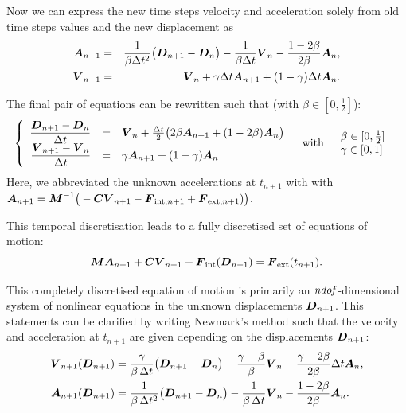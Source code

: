 Now we can express the new time steps velocity and acceleration solely from old time steps values and the new displacement as
\begin{eqnarray*}
  \boldsymbol{A}_{n+1}
  &=& \frac{1}{\beta\Delta t^2} \big( \boldsymbol{D}_{n+1} - \boldsymbol{D}_n \big)
  - \frac{1}{\beta \Delta t} \boldsymbol{V}_n
  - \frac{1-2\beta}{2\beta} \boldsymbol{A}_n\text{,}\\
    \boldsymbol{V}_{n+1}
  &=& \boldsymbol{V}_{n} + \gamma\Delta t \boldsymbol{A}_{n+1} + (1-\gamma)\Delta t\boldsymbol{A}_n\text{.}
\end{eqnarray*}

The final pair of equations can be rewritten such that (with $\beta\in[0,\frac{1}{2}]$):
\begin{equation}\label{strdyn:eq:newmark}
\begin{aligned}
& \left\{\begin{array}{rcl}
  \dfrac{\boldsymbol{D}_{n+1} - \boldsymbol{D}_n}{\Delta t}
  & =
  & \boldsymbol{V}_n + \frac{\Delta t}{2} \big(
    2\beta \boldsymbol{A}_{n+1} + (1-2\beta) \boldsymbol{A}_n
    \big)
\\
  \dfrac{\boldsymbol{V}_{n+1} - \boldsymbol{V}_n}{\Delta t}
  & =
  & \gamma \boldsymbol{A}_{n+1} + (1-\gamma)\boldsymbol{A}_n
\end{array}\right.
&& \text{with}
&&\begin{array}{l}
  \beta\in[0,\frac{1}{2}]
\\
  \gamma\in[0,1]
\end{array}
\end{aligned}
\end{equation}
Here, we abbreviated the unknown accelerations at $t_{n+1}$ with with
$\boldsymbol{A}_{n+1} = \boldsymbol{M}^{-1} \big( -\boldsymbol{C} \boldsymbol{V}_{n+1} -
\boldsymbol{F}_{\text{int};n+1} + \boldsymbol{F}_{\text{ext};n+1}) \big)$. 

This temporal discretisation leads to a
fully discretised set of equations of motion:
\begin{equation}
  \boldsymbol{M} \boldsymbol{A}_{n+1}
  + \boldsymbol{C} \boldsymbol{V}_{n+1}
  + \boldsymbol{F}_{\text{int}}(\boldsymbol{D}_{n+1})
  = \boldsymbol{F}_{\text{ext}}(t_{n+1})
  \text{.}
\end{equation}

This completely discretised equation of motion is primarily an
$\mathit{ndof}$-dimensional system of nonlinear equations in the unknown displacements
$\boldsymbol{D}_{n+1}$. This statements can be clarified by writing Newmark's method
such that the velocity and acceleration at $t_{n+1}$ are given depending on the
displacements $\boldsymbol{D}_{n+1}$:
\begin{align}\label{strdyn:eq:newmark-velnew}
   \boldsymbol{V}_{n+1}(\boldsymbol{D}_{n+1})
&  = \frac{\gamma}{\beta\, \Delta t} \big( \boldsymbol{D}_{n+1} - \boldsymbol{D}_n \big)
   - \frac{\gamma-\beta}{\beta} \boldsymbol{V}_{n}
   - \frac{\gamma-2\beta}{2\beta}\Delta t \boldsymbol{A}_n
   \text{,}
\\ \label{strdyn:eq:newmark-accnew}
   \boldsymbol{A}_{n+1}(\boldsymbol{D}_{n+1})
&  = \frac{1}{\beta\, \Delta t^2} \big( \boldsymbol{D}_{n+1} - \boldsymbol{D}_n \big)
   - \frac{1}{\beta\,\Delta t} \boldsymbol{V}_{n}
   - \frac{1-2\beta}{2\beta} \boldsymbol{A}_n
   \text{.}
\end{align}

